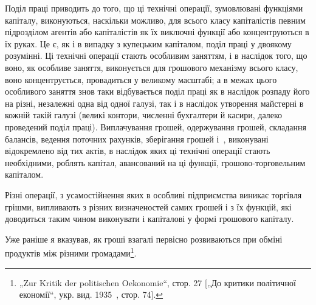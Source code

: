 Поділ праці приводить до того, що ці технічні операції, зумовлювані
функціями капіталу, виконуються, наскільки можливо,
для всього класу капіталістів певним підрозділом агентів або
капіталістів як їх виключні функції або концентруються в їх
руках. Це є, як і в випадку з купецьким капіталом, поділ праці
у двоякому розумінні. Ці технічні операції стають особливим заняттям,
і в наслідок того, що воно, як особливе заняття, виконується
для грошового механізму всього класу, воно концентрується, провадиться
у великому масштабі; а в межах цього особливого заняття
знов таки відбувається поділ праці як в наслідок розпаду його
на різні, незалежні одна від одної галузі, так і в наслідок утворення
майстерні в кожній такій галузі (великі контори, численні
бухгалтери й касири, далеко проведений поділ праці).
Виплачування грошей, одержування грошей, складання балансів,
ведення поточних рахунків, зберігання грошей і~, виконувані
відокремлено від тих актів, в наслідок яких ці технічні операції
стають необхідними, роблять капітал, авансований на ці
функції, грошово-торговельним капіталом.

Різні операції, з усамостійнення яких в особливі підприємства
виникає торгівля грішми, випливають з різних визначеностей
самих грошей і з їх функцій, які доводиться таким чином виконувати
і капіталові у формі грошового капіталу.

Уже раніше я вказував, як гроші взагалі первісно розвиваються
при обміні продуктів між різними громадами\footnote{
„Zur Kritik der politischen Oekonomie“, стор. 27 [„До критики політичної
економії“, укр. вид. 1935~, стор. 74].
}.

